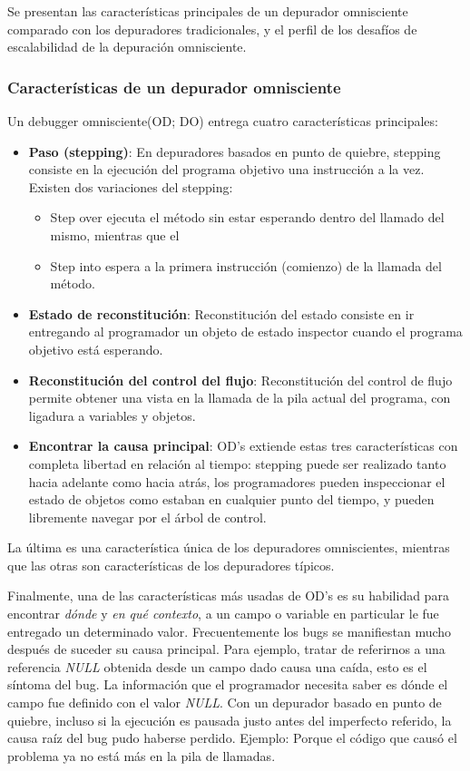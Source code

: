 \documentclass[12pt,legalpaper]{report}
\begin{document}
	Se presentan las características principales de un depurador omnisciente comparado con los depuradores tradicionales, y el perfil de los desafíos de escalabilidad de la depuración omnisciente.

			\subsubsection[Características]{Características de un depurador omnisciente \label{caracteristicasDepurador}}

	Un debugger omnisciente(OD; DO) entrega cuatro características principales:
\begin{itemize}
	\item \textbf{Paso (stepping)}: En depuradores basados en punto de quiebre, stepping consiste en la ejecución del programa objetivo una instrucción a la vez.  Existen dos variaciones del stepping:
	\begin{itemize}
		\item Step over ejecuta el método sin estar esperando dentro del llamado del mismo, mientras que el 
		\item Step into espera a la primera instrucción (comienzo) de la llamada del método.	
	\end{itemize}	
	
	\item \textbf{Estado de reconstitución}: Reconstitución del estado consiste en ir entregando al programador un objeto de estado inspector cuando el programa objetivo está esperando.		
	\item \textbf{Reconstitución del control del flujo}: Reconstitución del control de flujo permite obtener una vista en la llamada de la pila actual del programa, con ligadura a variables y objetos.	
	\item \textbf{Encontrar la causa principal}: OD's extiende estas tres características con completa libertad en relación al tiempo:  stepping puede ser realizado tanto hacia adelante como hacia atrás, los programadores pueden inspeccionar el estado de objetos como estaban en cualquier punto del tiempo, y pueden libremente navegar por el árbol de control.	
	
\end{itemize}
La última es una característica única de los depuradores omniscientes, mientras que las otras son características de los depuradores típicos.

	Finalmente, una de las características más usadas de OD's es su habilidad para encontrar \textit{dónde} y \textit{en qué contexto}, a un campo o variable en particular le fue entregado un determinado valor.  Frecuentemente los bugs se manifiestan mucho después de suceder su causa principal.  Para ejemplo, tratar de referirnos a una referencia \textit{NULL} obtenida desde un campo dado causa una caída, esto es el síntoma del bug.  La información que el programador necesita saber es dónde el campo fue definido con el valor \textit{NULL}.  Con un depurador basado en punto de quiebre, incluso si la ejecución es pausada justo antes del imperfecto referido, la causa raíz del bug pudo haberse perdido.  Ejemplo:  Porque el código que causó el problema ya no está más en la pila de llamadas.
\end{document}
